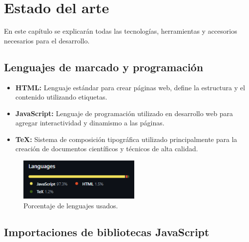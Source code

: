 \documentclass[a4paper, 12pt]{book}
\begin{document}

\cleardoublepage
\chapter{Estado del arte}
\label{chap:estado}

En este capítulo se explicarán todas las tecnologías, herramientas y accesorios necesarios para el desarrollo.


\section{Lenguajes de marcado y programación} 
\label{sec:lenguajes}

\begin{itemize}
  \item \textbf{HTML:} Lenguaje estándar para crear páginas web, define la estructura y el contenido utilizando etiquetas.
  
  \item \textbf{JavaScript:} Lenguaje de programación utilizado en desarrollo web para agregar interactividad y dinamismo a las páginas.
  
  \item \textbf{TeX:} Sistema de composición tipográfica utilizado principalmente para la creación de documentos científicos y técnicos de alta calidad.
  
\end{itemize}

\begin{figure}
  \centering
  \includegraphics[width=6cm, keepaspectratio]{img/lenguajes.png}
  \caption{Porcentaje de lenguajes usados.}
  \label{fig:lenguajes}
\end{figure}


\section{Importaciones de bibliotecas JavaScript} 
\label{sec:importaciones}
\end{document}
